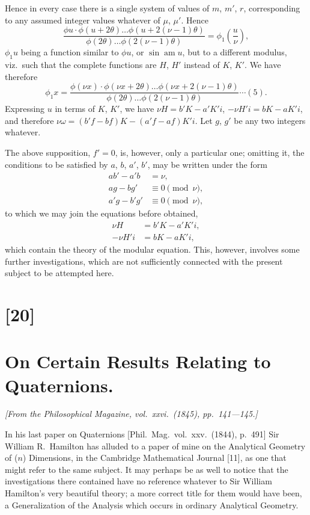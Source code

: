 \documentclass[12pt,a4paper]{article}
\begin{document}
Hence in every case there is a single system of values of $m$, $m'$, $r$, corresponding to
any assumed integer values whatever of $\mu$, $\mu'$. Hence
\[
\frac{\phi u \cdot \phi(u + 2\theta) \ldots \phi(u + 2(\nu-1)\theta)}{\phi(2\theta) \ldots \phi(2(\nu-1)\theta)} = \phi_1\left(\frac{u}{\nu}\right),
\]
$\phi_1 u$ being a function similar to $\phi u$, or $\sin \operatorname{am} u$, but to a different modulus, viz.\ such
that the complete functions are $H$, $H'$ instead of $K$, $K'$. We have therefore
\[
\phi_1 x = \frac{\phi(\nu x) \cdot \phi(\nu x + 2\theta) \ldots \phi(\nu x + 2(\nu-1)\theta)}{\phi(2\theta) \ldots \phi(2(\nu-1)\theta)} \cdots (5).
\]
Expressing $u$ in terms of $K$, $K'$, we have $\nu H = b'K - a'K'i$, $-\nu H'i = bK - aK'i$, and
therefore $\nu\omega = (b'f - bf)K - (a'f - af)K'i$. Let $g$, $g'$ be any two integers whatever.

\newpage
\setcounter{page}{122}

The above supposition, $f' = 0$, is, however, only a particular one; omitting it, the
conditions to be satisfied by $a$, $b$, $a'$, $b'$, may be written under the form
\begin{align*}
ab' - a'b &= \nu,\\
ag - bg' &\equiv 0 \pmod{\nu},\\
a'g - b'g' &\equiv 0 \pmod{\nu},
\end{align*}
to which we may join the equations before obtained,
\begin{align*}
\nu H &= b'K - a'K'i,\\
-\nu H'i &= bK - aK'i,
\end{align*}
which contain the theory of the modular equation. This, however, involves some
further investigations, which are not sufficiently connected with the present subject to
be attempted here.

\newpage
\section*{[20]}
\section*{On Certain Results Relating to Quaternions.}

\textit{[From the Philosophical Magazine, vol.~xxvi.~(1845), pp.~141---145.]}

\bigskip
\setcounter{page}{123}

In his last paper on Quaternions [Phil.\ Mag.\ vol.~xxv.~(1844), p.~491] Sir William
R.~Hamilton has alluded to a paper of mine on the Analytical Geometry of ($n$)
Dimensions, in the Cambridge Mathematical Journal [11], as one that might refer to the
same subject. It may perhaps be as well to notice that the investigations there contained
have no reference whatever to Sir William Hamilton's very beautiful theory; a more
correct title for them would have been, a Generalization of the Analysis which occurs
in ordinary Analytical Geometry.
\end{document}
